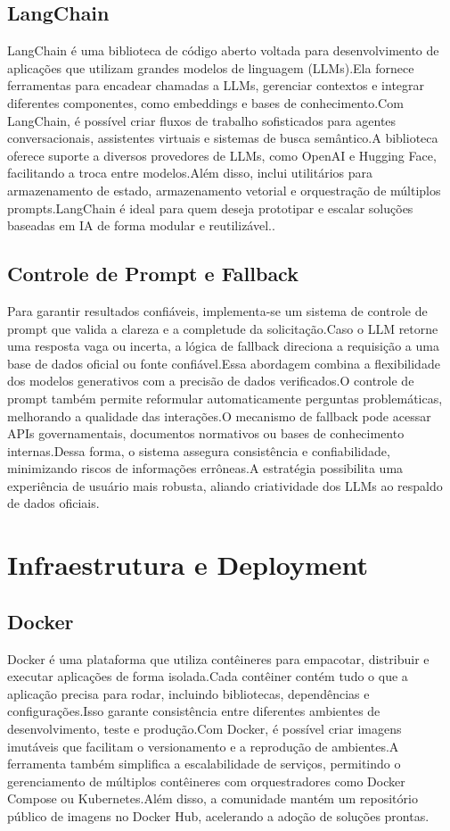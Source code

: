 \subsection{LangChain}
LangChain é uma biblioteca de código aberto voltada para desenvolvimento de aplicações que utilizam grandes modelos de linguagem (LLMs).Ela fornece ferramentas para encadear chamadas a LLMs, gerenciar contextos e integrar diferentes componentes, como embeddings e bases de conhecimento.Com LangChain, é possível criar fluxos de trabalho sofisticados para agentes conversacionais, assistentes virtuais e sistemas de busca semântico.A biblioteca oferece suporte a diversos provedores de LLMs, como OpenAI e Hugging Face, facilitando a troca entre modelos.Além disso, inclui utilitários para armazenamento de estado, armazenamento vetorial e orquestração de múltiplos prompts.LangChain é ideal para quem deseja prototipar e escalar soluções baseadas em IA de forma modular e reutilizável.\cite{langchain2024}.

\subsection{Controle de Prompt e Fallback}
Para garantir resultados confiáveis, implementa-se um sistema de controle de prompt que valida a clareza e a completude da solicitação.Caso o LLM retorne uma resposta vaga ou incerta, a lógica de fallback direciona a requisição a uma base de dados oficial ou fonte confiável.Essa abordagem combina a flexibilidade dos modelos generativos com a precisão de dados verificados.O controle de prompt também permite reformular automaticamente perguntas problemáticas, melhorando a qualidade das interações.O mecanismo de fallback pode acessar APIs governamentais, documentos normativos ou bases de conhecimento internas.Dessa forma, o sistema assegura consistência e confiabilidade, minimizando riscos de informações errôneas.A estratégia possibilita uma experiência de usuário mais robusta, aliando criatividade dos LLMs ao respaldo de dados oficiais.

\section{Infraestrutura e Deployment}
\subsection{Docker}
Docker é uma plataforma que utiliza contêineres para empacotar, distribuir e executar aplicações de forma isolada.Cada contêiner contém tudo o que a aplicação precisa para rodar, incluindo bibliotecas, dependências e configurações.Isso garante consistência entre diferentes ambientes de desenvolvimento, teste e produção.Com Docker, é possível criar imagens imutáveis que facilitam o versionamento e a reprodução de ambientes.A ferramenta também simplifica a escalabilidade de serviços, permitindo o gerenciamento de múltiplos contêineres com orquestradores como Docker Compose ou Kubernetes.Além disso, a comunidade mantém um repositório público de imagens no Docker Hub, acelerando a adoção de soluções prontas.\cite{docker2024}


